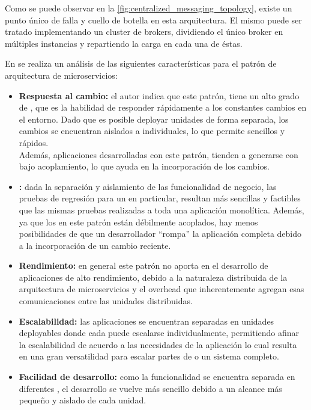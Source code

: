 Como se puede observar en la \autoref{fig:centralized_messaging_topology}, existe un punto único de falla y cuello de botella en esta arquitectura. El mismo puede ser tratado implementando un cluster de brokers, dividiendo el único broker en múltiples instancias y repartiendo la carga en cada una de éstas.\cite[p.~31]{richards2015}

En \cite[p.~34]{richards2015} se realiza un análisis de las siguientes características para el patrón de arquitectura de microservicios:

\begin{itemize}
  \item \textbf{Respuesta al cambio:} el autor indica que este patrón, tiene un alto grado de , que es la habilidad de responder rápidamente a los constantes cambios en el entorno.  Dado que es posible deployar unidades de forma separada, los cambios se encuentran aislados a  individuales, lo que permite  sencillos y rápidos.\\
  Además, aplicaciones desarrolladas con este patrón, tienden a generarse con bajo acoplamiento, lo que ayuda en la incorporación de los cambios.

  \item \textbf{:} dada la separación y aislamiento de las funcionalidad de negocio, las pruebas de regresión para un  en particular, resultan más sencillas y factibles que las mismas pruebas realizadas a toda una aplicación monolítica.  Además, ya que los  en este patrón están débilmente acoplados, hay menos posibilidades de que un desarrollador ``rompa'' la aplicación completa debido a la incorporación de un cambio reciente.

  \item \textbf{Rendimiento:} en general este patrón no aporta en el desarrollo de aplicaciones de alto rendimiento, debido a la naturaleza distribuida de la arquitectura de microservicios y el overhead que inherentemente agregan esas comunicaciones entre las unidades distribuidas.

  \item \textbf{Escalabilidad:} las aplicaciones se encuentran separadas en unidades deployables donde cada  puede escalarse individualmente, permitiendo afinar la escalabilidad de acuerdo a las necesidades de la aplicación lo cual resulta en una gran versatilidad para escalar partes de o un sistema completo.

  \item \textbf{Facilidad de desarrollo:} como la funcionalidad se encuentra separada en diferentes , el desarrollo se vuelve más sencillo debido a un alcance más pequeño y aislado de cada unidad.
\end{itemize}
